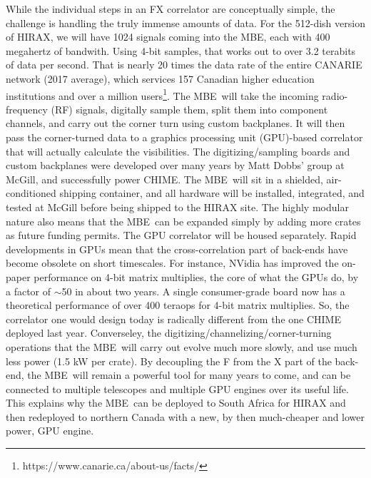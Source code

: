 \documentclass[letterpaper,11pt,preprint]{aastex}
\newcommand{\mbe}{{\rm MBE}}
\begin{document}
While the individual steps in an FX correlator are conceptually
simple, the challenge is handling the truly immense amounts of data.
For the 512-dish version of HIRAX, we will have 1024 signals coming
into the \mbe, each with 400 megahertz of bandwith.  Using 4-bit
samples, that works out to over 3.2 terabits of data per second.  That
is nearly 20 times the data rate of the entire CANARIE network (2017
average), which services 157 Canadian higher education institutions
and over a million
users\footnote{https://www.canarie.ca/about-us/facts/}.  The
\mbe\ will take the incoming radio-frequency (RF) signals, digitally
sample them, split them into component channels, and carry out the
corner turn using custom backplanes.  It will then pass the
corner-turned data to a graphics processing unit (GPU)-based
correlator that will actually calculate the visibilities.  The
digitizing/sampling boards and custom backplanes were developed over
many years by Matt Dobbs' group at McGill, and successfully power CHIME.
The \mbe\ will sit in a shielded, air-conditioned shipping container,
and all hardware will be installed, integrated, and tested at McGill
before being shipped to the HIRAX site.  The highly modular nature
also means that the \mbe\ can be expanded simply by adding more crates
as future funding permits.  The GPU correlator will be housed
separately.  Rapid developments in GPUs mean that the
cross-correlation part of back-ends have become obsolete on short
timescales.  For instance, NVidia has improved the on-paper
performance on 4-bit matrix multiplies, the core of what the GPUs do,
by a factor of $\sim$50 in about two years.  A single consumer-grade
board now has a theoretical performance of over 400 teraops for 4-bit
matrix multiplies.  So, the correlator one would design today is
radically different from the one CHIME deployed last year.
Converseley, the digitizing/channelizing/corner-turning operations
that the \mbe\ will carry out evolve much more slowly, and use much
less power (1.5 kW per crate).  By decoupling the F from the X part of
the back-end, the \mbe\ will remain a powerful tool for many years to
come, and can be connected to multiple telescopes and multiple GPU
engines over its useful life.  This explains why the \mbe\ can be
deployed to South Africa for HIRAX and then redeployed to northern
Canada with a new, by then much-cheaper and lower power, GPU engine.
\end{document}
